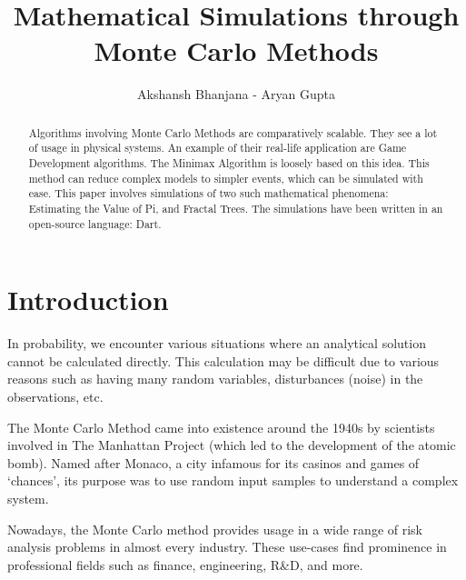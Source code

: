 \documentclass{resonance}
\begin{document}
\title{Mathematical Simulations through Monte Carlo Methods}
\author{Akshansh Bhanjana - Aryan Gupta}

\maketitle
{}

\begin{abstract}
Algorithms involving Monte Carlo Methods are comparatively scalable. They see a lot of usage in physical systems. An example of their real-life application are Game Development algorithms. The Minimax Algorithm is loosely based on this idea. This method can reduce complex models to simpler events, which can be simulated with ease. This paper involves simulations of two such mathematical phenomena: Estimating the Value of Pi, and Fractal Trees. The simulations have been written in an open-source language: Dart.
\end{abstract}



\section*{Introduction}
In probability, we encounter various situations where an analytical solution cannot be calculated directly. This calculation may be difficult due to various reasons such as having many random variables, disturbances (noise) in the observations, etc.

The Monte Carlo Method came into existence around the 1940s by scientists involved in The Manhattan Project (which led to the development of the atomic bomb). Named after Monaco, a city infamous for its casinos and games of ‘chances’, its purpose was to use random input samples to understand a complex system. 

Nowadays, the Monte Carlo method provides usage in a wide range of risk analysis problems in almost every industry. These use-cases find prominence in professional fields such as finance, engineering, R\&D, and more.
\end{document}
